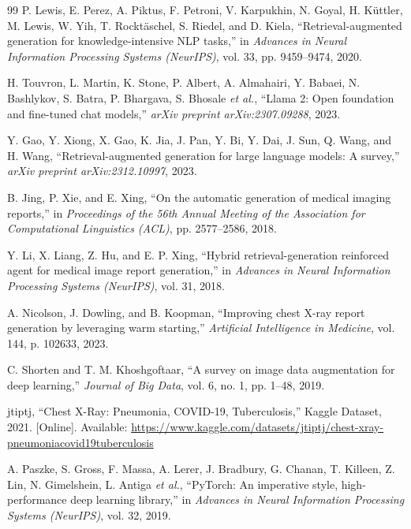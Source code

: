 \documentclass[12pt]{report}
\begin{document}
\begin{thebibliography}{99}
P. Lewis, E. Perez, A. Piktus, F. Petroni, V. Karpukhin,
N. Goyal, H. K{\"u}ttler, M. Lewis, W. Yih, T. Rockt{\"a}schel,
S. Riedel, and D. Kiela,
``Retrieval-augmented generation for knowledge-intensive NLP tasks,''
in \textit{Advances in Neural Information Processing Systems
(NeurIPS)}, vol. 33, pp. 9459--9474, 2020.

H. Touvron, L. Martin, K. Stone, P. Albert, A. Almahairi,
Y. Babaei, N. Bashlykov, S. Batra, P. Bhargava, S. Bhosale
\textit{et al.},
``Llama 2: Open foundation and fine-tuned chat models,''
\textit{arXiv preprint arXiv:2307.09288}, 2023.

Y. Gao, Y. Xiong, X. Gao, K. Jia, J. Pan, Y. Bi, Y. Dai,
J. Sun, Q. Wang, and H. Wang,
``Retrieval-augmented generation for large language models:
A survey,''
\textit{arXiv preprint arXiv:2312.10997}, 2023.

B. Jing, P. Xie, and E. Xing,
``On the automatic generation of medical imaging reports,''
in \textit{Proceedings of the 56th Annual Meeting of the
Association for Computational Linguistics (ACL)},
pp. 2577--2586, 2018.

Y. Li, X. Liang, Z. Hu, and E. P. Xing,
``Hybrid retrieval-generation reinforced agent for medical image
report generation,''
in \textit{Advances in Neural Information Processing Systems
(NeurIPS)}, vol. 31, 2018.

A. Nicolson, J. Dowling, and B. Koopman,
``Improving chest X-ray report generation by leveraging warm
starting,''
\textit{Artificial Intelligence in Medicine}, vol. 144,
p. 102633, 2023.

C. Shorten and T. M. Khoshgoftaar,
``A survey on image data augmentation for deep learning,''
\textit{Journal of Big Data}, vol. 6, no. 1, pp. 1--48, 2019.

jtiptj,
``Chest X-Ray: Pneumonia, COVID-19, Tuberculosis,''
Kaggle Dataset, 2021. [Online]. Available:
\url{https://www.kaggle.com/datasets/jtiptj/chest-xray-pneumoniacovid19tuberculosis}

A. Paszke, S. Gross, F. Massa, A. Lerer, J. Bradbury, G. Chanan,
T. Killeen, Z. Lin, N. Gimelshein, L. Antiga \textit{et al.},
``PyTorch: An imperative style, high-performance deep learning
library,''
in \textit{Advances in Neural Information Processing Systems
(NeurIPS)}, vol. 32, 2019.


\end{thebibliography}
\end{document}
